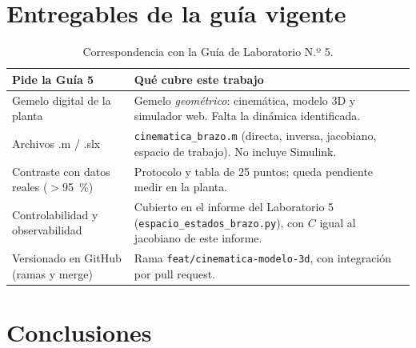 \documentclass[a4paper,12pt]{article}
\newcommand{\codigo}[1]{\texttt{\small #1}}
\begin{document}
\section{Entregables de la guía vigente}
\label{sec:guia}
\begin{table}[H]
\centering
\begin{tabular}{@{}p{6.2cm}p{8.6cm}@{}}
\toprule
\textbf{Pide la Guía 5} & \textbf{Qué cubre este trabajo}\\
\midrule
Gemelo digital de la planta & Gemelo \emph{geométrico}: cinemática, modelo 3D y simulador web. Falta la dinámica identificada.\\
Archivos .m / .slx & \codigo{cinematica\_brazo.m} (directa, inversa, jacobiano, espacio de trabajo). No incluye Simulink.\\
Contraste con datos reales ($>$95~\%) & Protocolo y tabla de 25 puntos; queda pendiente medir en la planta.\\
Controlabilidad y observabilidad & Cubierto en el informe del Laboratorio 5 (\codigo{espacio\_estados\_brazo.py}), con $C$ igual al jacobiano de este informe.\\
Versionado en GitHub (ramas y merge) & Rama \codigo{feat/cinematica-modelo-3d}, con integración por pull request.\\
\bottomrule
\end{tabular}
\caption{Correspondencia con la Guía de Laboratorio N.º 5.}
\end{table}

\section{Conclusiones}
\end{document}
